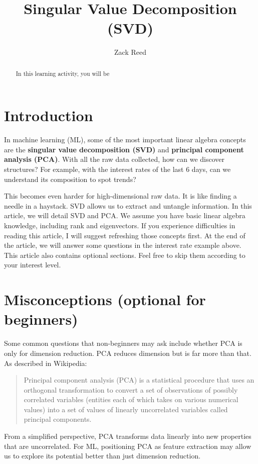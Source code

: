 \documentclass{ximera}
\author{Zack Reed}
\title{Singular Value Decomposition (SVD)}
\begin{document}
\begin{abstract}

    In this learning activity, you will be 
\end{abstract}
\maketitle

\section*{Introduction}
In machine learning (ML), some of the most important linear algebra concepts are the \textbf{singular value decomposition (SVD)} and \textbf{principal component analysis (PCA)}. With all the raw data collected, how can we discover structures? For example, with the interest rates of the last 6 days, can we understand its composition to spot trends?

This becomes even harder for high-dimensional raw data. It is like finding a needle in a haystack. SVD allows us to extract and untangle information. In this article, we will detail SVD and PCA. We assume you have basic linear algebra knowledge, including rank and eigenvectors. If you experience difficulties in reading this article, I will suggest refreshing those concepts first. At the end of the article, we will answer some questions in the interest rate example above. This article also contains optional sections. Feel free to skip them according to your interest level.

\section*{Misconceptions (optional for beginners)}
Some common questions that non-beginners may ask include whether PCA is only for dimension reduction. PCA reduces dimension but is far more than that. As described in Wikipedia:

\begin{quote}
Principal component analysis (PCA) is a statistical procedure that uses an orthogonal transformation to convert a set of observations of possibly correlated variables (entities each of which takes on various numerical values) into a set of values of linearly uncorrelated variables called principal components.
\end{quote}

From a simplified perspective, PCA transforms data linearly into new properties that are uncorrelated. For ML, positioning PCA as feature extraction may allow us to explore its potential better than just dimension reduction.
\end{document}
